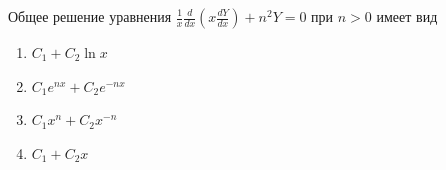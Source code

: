 Общее решение уравнения \(\frac{1}{x}\frac{d}{dx}\left(x\frac{dY}{dx}\right)+n^2Y=0\) при \(n>0\) имеет вид

\begin{enumerate}[label=\arabic*)]
    \item \(C_1+C_2\ln x\)
    \item \(C_1e^{nx}+C_2e^{-nx}\)
    \item \(C_1x^n+C_2x^{-n}\)
    \item \(C_1+C_2x\)
\end{enumerate}

